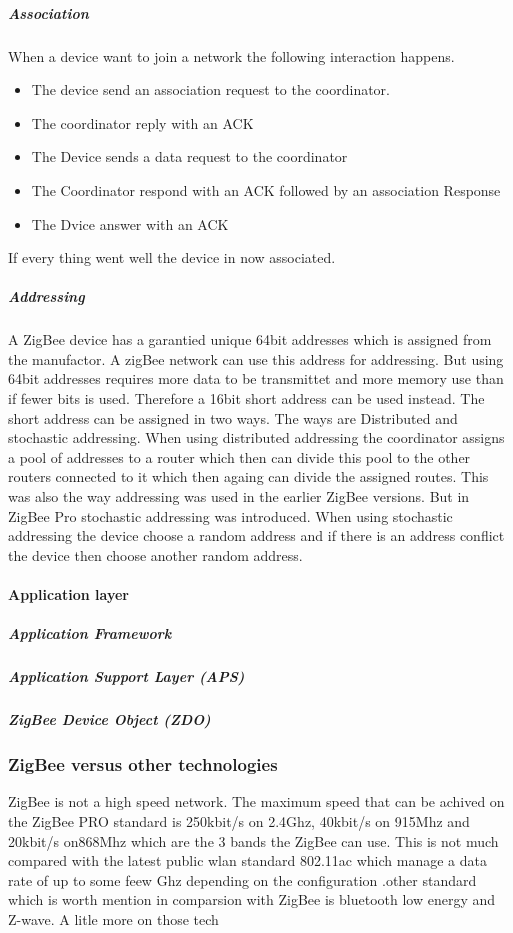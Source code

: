\documentclass[a4paper,12pt,english]{article}
\begin{document}
\subparagraph{Association}
When a device want to join a network the following interaction happens.

\begin{itemize}
  \item The device send an association request to the coordinator.
  \item The coordinator reply with an ACK
  \item The Device sends a data request to the coordinator
  \item The Coordinator respond with an ACK followed by an association Response
  \item The Dvice answer with an ACK
\end{itemize}
If every thing went well the device in now associated.

\subparagraph{Addressing}
A ZigBee device has a garantied unique 64bit addresses which is assigned from
the manufactor. A zigBee network can use this address for addressing. But using
64bit addresses requires more data to be transmittet and more memory use than
if fewer bits is used. Therefore a 16bit short address can be used instead. The
short address can be assigned in two ways. The ways are Distributed and
stochastic addressing. When using distributed addressing the coordinator assigns
a pool of addresses to a router which then can divide this pool to the other
routers connected to it which then againg can divide the assigned routes. This
was also the way addressing was used in the earlier ZigBee versions. But in
ZigBee Pro stochastic addressing was introduced. When using stochastic
addressing the device choose a random address and if there is an address
conflict the device then choose another random address.


\paragraph{Application layer}
\subparagraph{Application Framework}
\subparagraph{Application Support Layer (APS)} \subparagraph{ZigBee Device Object
(ZDO)}
\subsubsection{ZigBee versus other technologies}
ZigBee is not a high speed network. The maximum speed that can be
achived on the ZigBee PRO standard is 250kbit/s on 2.4Ghz, 40kbit/s on 915Mhz
and 20kbit/s on868Mhz which are the 3 bands the ZigBee can
use\cite{zigbee}.
This is not much compared with the latest public wlan standard 802.11ac which manage a data rate
of up to some feew Ghz depending on the configuration \cite{802.11ac}.other
standard which is worth mention in comparsion with ZigBee is bluetooth low
energy and Z-wave. A litle more on those tech
\end{document}
